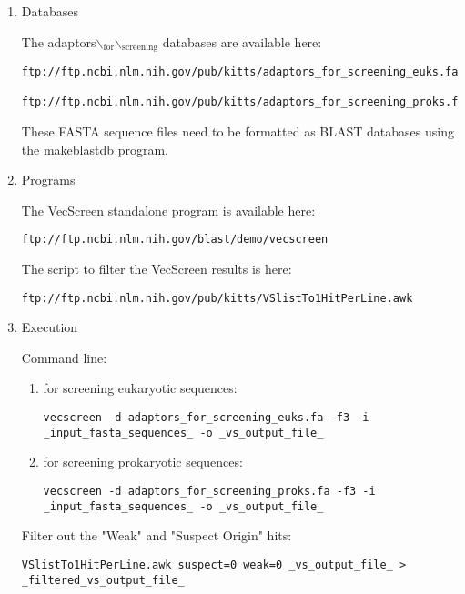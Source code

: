 \documentclass[11pt]{article}
\begin{document}
\begin{enumerate}
\item Databases
\label{sec:org8e33b96}


The adaptors$\backslash$\(_{\text{for}}\)$\backslash$\(_{\text{screening}}\) databases are available here:

\begin{verbatim}
ftp://ftp.ncbi.nlm.nih.gov/pub/kitts/adaptors_for_screening_euks.fa

ftp://ftp.ncbi.nlm.nih.gov/pub/kitts/adaptors_for_screening_proks.fa
\end{verbatim}

These FASTA sequence files need to be formatted as BLAST databases using
the makeblastdb program.

\item Programs
\label{sec:org703d5ab}


The VecScreen standalone program is available here:

\begin{verbatim}
ftp://ftp.ncbi.nlm.nih.gov/blast/demo/vecscreen
\end{verbatim}

The script to filter the VecScreen results is here:

\begin{verbatim}
ftp://ftp.ncbi.nlm.nih.gov/pub/kitts/VSlistTo1HitPerLine.awk
\end{verbatim}

\item Execution
\label{sec:org0d21d0f}


Command line:

\begin{enumerate}
\item for screening eukaryotic sequences:

\begin{verbatim}
vecscreen -d adaptors_for_screening_euks.fa -f3 -i _input_fasta_sequences_ -o _vs_output_file_
\end{verbatim}

\item for screening prokaryotic sequences:

\begin{verbatim}
vecscreen -d adaptors_for_screening_proks.fa -f3 -i _input_fasta_sequences_ -o _vs_output_file_
\end{verbatim}
\end{enumerate}

Filter out the "Weak" and "Suspect Origin" hits:

\begin{verbatim}
VSlistTo1HitPerLine.awk suspect=0 weak=0 _vs_output_file_ > _filtered_vs_output_file_
\end{verbatim}
\end{enumerate}
\end{document}
